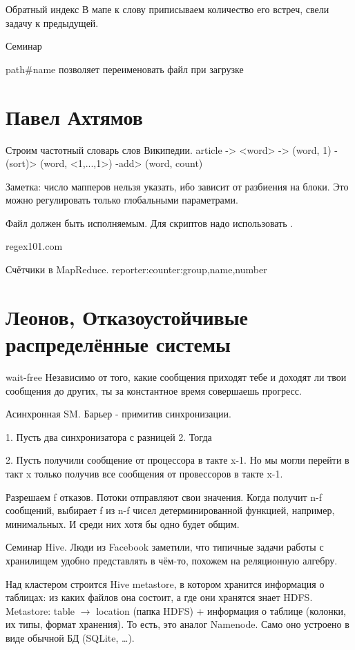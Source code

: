 \begin{enumarate}
Обратный индекс
В мапе к слову приписываем количество его встреч, свели задачу к предыдущей.

Семинар

path#name позволяет переименовать файл при загрузке

\section{Павел Ахтямов}
Строим частотный словарь слов Википедии. article -> <word> -> (word, 1) -(sort)> (word, <1,...,1>) -add> (word, count) 

Заметка: число мапперов нельзя указать, ибо зависит от разбиения на блоки. Это можно регулировать только глобальными параметрами.

Файл должен быть исполняемым. Для скриптов надо использовать .

regex101.com

Счётчики в MapReduce. reporter:counter:group,name,number


\section{Леонов, Отказоустойчивые распределённые системы}
wait-free
Независимо от того, какие сообщения приходят тебе и доходят ли твои сообщения до других, ты за константное время совершаешь прогресс.

Асинхронная SM. Барьер - примитив синхронизации.

1. Пусть два синхронизатора с разницей 2. Тогда 

2. Пусть получили сообщение от процессора в такте x-1. Но мы могли перейти в такт x только получив все сообщения от провессоров в такте x-1.

Разрешаем f отказов. Потоки отправляют свои значения. Когда получит n-f сообщений, выбирает f из n-f чисел детерминированной функцией, например, минимальных. И среди них хотя бы одно будет общим.

Семинар
Hive. Люди из Facebook заметили, что типичные задачи работы с хранилищем удобно представлять в чём-то, похожем на реляционную алгебру.

Над кластером строится Hive metastore, в котором хранится информация о таблицах: из каких файлов она состоит, а где они хранятся знает HDFS.
Metastore: table $\rightarrow$ location (папка HDFS) + информация о таблице (колонки, их типы, формат хранения).
То есть, это аналог Namenode. Само оно устроено в виде обычной БД (SQLite, \dots).


\end{enumarate}
